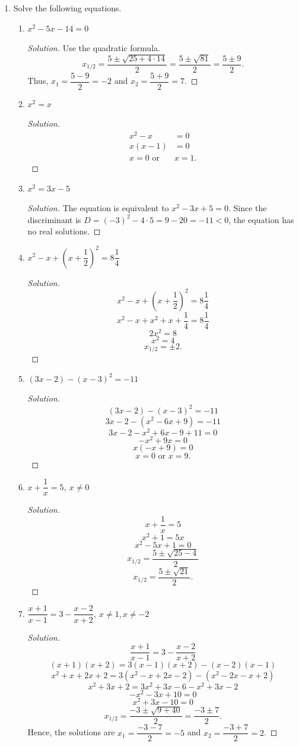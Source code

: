 \documentclass[12pt]{article}
\newenvironment{solution}{\begin{proof}[Solution]}{\end{proof}}
\begin{document}
\begin{enumerate}
		\item Solve the following equations.
		\begin{enumerate}
			\item $x^2-5x-14=0$
			\begin{solution}
				Use the quadratic formula.
				$$x_{1/2}=\dfrac{5\pm\sqrt{25+4\cdot 14}}{2}=\dfrac{5\pm\sqrt{81}}{2}=\dfrac{5\pm9}{2}.$$
				Thus, $x_1=\dfrac{5-9}{2}=-2$ and $x_2=\dfrac{5+9}{2}=7$.
			\end{solution}
			\item $x^2=x$
			\begin{solution}
				\begin{align*}
					x^2-x&=0\\
					x(x-1)&=0\\
					x=0 \text{ or } &x=1.
				\end{align*}
			\end{solution}
			\item $x^2=3x-5$
			\begin{solution}
				The equation is equivalent to $x^2-3x+5=0$. Since the discriminant is $D=(-3)^2-4\cdot 5=9-20=-11<0$, the equation has no real solutions.
			\end{solution}
			\item $x^2-x+(x+\dfrac{1}{2})^2=8\dfrac{1}{4}$
			\begin{solution}
				$$x^2-x+(x+\dfrac{1}{2})^2=8\dfrac{1}{4}$$
				$$x^2-x+x^2+x+\dfrac{1}{4}=8\dfrac{1}{4}$$
				$$2x^2=8$$
				$$x^2=4$$
				$$x_{1/2}=\pm2.$$
			\end{solution}
			\item $(3x-2)-(x-3)^2=-11$
			\begin{solution}
				$$(3x-2)-(x-3)^2=-11$$
				$$3x-2-(x^2-6x+9)=-11$$
				$$3x-2-x^2+6x-9+11=0$$
				$$-x^2+9x=0$$
				$$x(-x+9)=0$$
				$$x=0 \text{ or } x=9.$$
			\end{solution}
			\item $x+\dfrac{1}{x}=5,\ x\neq 0$
			\begin{solution}
				$$x+\dfrac{1}{x}=5$$
				$$x^2+1=5x$$
				$$x^2-5x+1=0$$
				$$x_{1/2}=\dfrac{5\pm\sqrt{25-4}}{2}$$
				$$x_{1/2}=\dfrac{5\pm \sqrt{21}}{2}.$$
			\end{solution}
			\item $\dfrac{x+1}{x-1}=3-\dfrac{x-2}{x+2},\ x\neq1,x\neq-2$
			\begin{solution}
				$$\dfrac{x+1}{x-1}=3-\dfrac{x-2}{x+2}$$
				$$(x+1)(x+2)=3(x-1)(x+2)-(x-2)(x-1)$$
				$$x^2+x+2x+2=3(x^2-x+2x-2)-(x^2-2x-x+2)$$
				$$x^2+3x+2=3x^2+3x-6-x^2+3x-2$$
				$$-x^2-3x+10=0$$
				$$x^2+3x-10=0$$
				$$x_{1/2}=\dfrac{-3\pm\sqrt{9+40}}{2}=\dfrac{-3\pm7}{2}.$$
				Hence, the solutions are $x_1=\dfrac{-3-7}{2}=-5$ and $x_2=\dfrac{-3+7}{2}=2$.
			\end{solution}
		\end{enumerate}
		

\end{enumerate}
\end{document}
